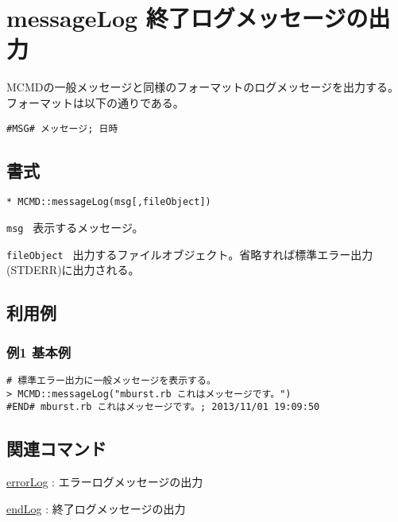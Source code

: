 
%

\section{messageLog 終了ログメッセージの出力\label{sect:messageLog}}
MCMDの一般メッセージと同様のフォーマットのログメッセージを出力する。
フォーマットは以下の通りである。

\begin{Verbatim}[baselinestretch=0.7,frame=single]
#MSG# メッセージ; 日時
\end{Verbatim}

\subsection{書式}

{\Large
\begin{verbatim}
* MCMD::messageLog(msg[,fileObject])
\end{verbatim}
} 

\begin{description}
	\setlength{\itemindent}{-5mm}
	\item {\large \verb/msg /} 表示するメッセージ。
	\item {\large \verb/fileObject /} 出力するファイルオブジェクト。省略すれば標準エラー出力(STDERR)に出力される。
\end{description}

\subsection{利用例}
\subsubsection*{例1 基本例}

\begin{Verbatim}[baselinestretch=0.7,frame=single]
# 標準エラー出力に一般メッセージを表示する。
> MCMD::messageLog("mburst.rb これはメッセージです。")
#END# mburst.rb これはメッセージです。; 2013/11/01 19:09:50
\end{Verbatim}

\subsection{関連コマンド}
\hyperref[sect:errorLogRB]{errorLog} : エラーログメッセージの出力

\hyperref[sect:endRB]{endLog} : 終了ログメッセージの出力

%

